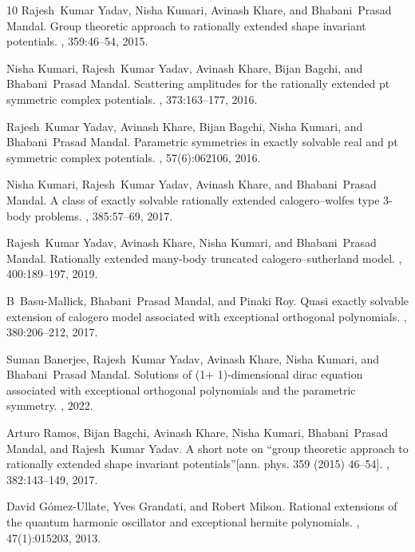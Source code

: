 \documentclass[11pt]{article}
\begin{document}
\begin{thebibliography}{10}
Rajesh~Kumar Yadav, Nisha Kumari, Avinash Khare, and Bhabani~Prasad Mandal.
\newblock Group theoretic approach to rationally extended shape invariant
  potentials.
, 359:46--54, 2015.

Nisha Kumari, Rajesh~Kumar Yadav, Avinash Khare, Bijan Bagchi, and
  Bhabani~Prasad Mandal.
\newblock Scattering amplitudes for the rationally extended pt symmetric
  complex potentials.
, 373:163--177, 2016.

Rajesh~Kumar Yadav, Avinash Khare, Bijan Bagchi, Nisha Kumari, and
  Bhabani~Prasad Mandal.
\newblock Parametric symmetries in exactly solvable real and pt symmetric
  complex potentials.
, 57(6):062106, 2016.

Nisha Kumari, Rajesh~Kumar Yadav, Avinash Khare, and Bhabani~Prasad Mandal.
\newblock A class of exactly solvable rationally extended calogero--wolfes type
  3-body problems.
, 385:57--69, 2017.

Rajesh~Kumar Yadav, Avinash Khare, Nisha Kumari, and Bhabani~Prasad Mandal.
\newblock Rationally extended many-body truncated calogero--sutherland model.
, 400:189--197, 2019.

B~Basu-Mallick, Bhabani~Prasad Mandal, and Pinaki Roy.
\newblock Quasi exactly solvable extension of calogero model associated with
  exceptional orthogonal polynomials.
, 380:206--212, 2017.

Suman Banerjee, Rajesh~Kumar Yadav, Avinash Khare, Nisha Kumari, and
  Bhabani~Prasad Mandal.
\newblock Solutions of (1+ 1)-dimensional dirac equation associated with
  exceptional orthogonal polynomials and the parametric symmetry.
, 2022.

Arturo Ramos, Bijan Bagchi, Avinash Khare, Nisha Kumari, Bhabani~Prasad Mandal,
  and Rajesh~Kumar Yadav.
\newblock A short note on “group theoretic approach to rationally extended
  shape invariant potentials”[ann. phys. 359 (2015) 46--54].
, 382:143--149, 2017.

David G{\'o}mez-Ullate, Yves Grandati, and Robert Milson.
\newblock Rational extensions of the quantum harmonic oscillator and
  exceptional hermite polynomials.
,
  47(1):015203, 2013.


\end{thebibliography}
\end{document}

